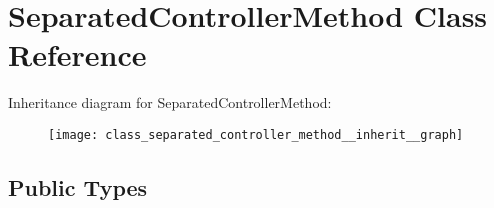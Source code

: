 \hypertarget{class_separated_controller_method}{\section{\-Separated\-Controller\-Method \-Class \-Reference}
\label{class_separated_controller_method}
}


\-Inheritance diagram for \-Separated\-Controller\-Method\-:
\nopagebreak
\begin{figure}[H]
\begin{center}
\leavevmode
\texttt{[image: class\_separated\_controller\_method\_\_inherit\_\_graph]}
\end{center}
\end{figure}
\subsection*{\-Public \-Types}
